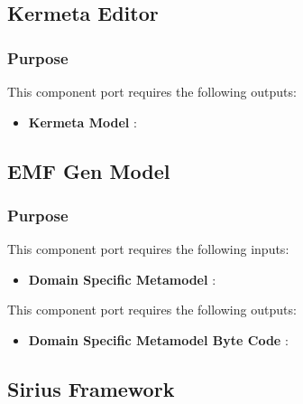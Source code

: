 \documentclass{gemoc} %
\begin{document}
\subsection{Kermeta Editor}


\subsubsection{Purpose}


This component port requires the following outputs:
\begin{itemize}
  \item \textbf{Kermeta Model} :
\end{itemize}

\subsection{EMF Gen Model}


\subsubsection{Purpose}

This component port requires the following inputs:
\begin{itemize}
  \item \textbf{Domain Specific Metamodel} :
\end{itemize}

This component port requires the following outputs:
\begin{itemize}
  \item \textbf{Domain Specific Metamodel Byte Code} :
\end{itemize}

\subsection{Sirius Framework}
\end{document}
